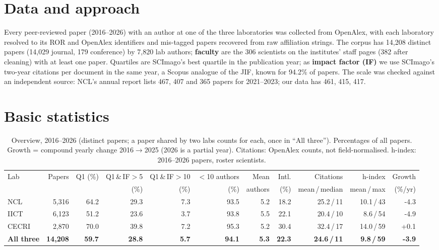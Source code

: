 \documentclass[10pt,a4paper,twocolumn]{article}
\begin{document}
\section{Data and approach}
Every peer-reviewed paper (2016--2026) with an author at one of the three laboratories was collected from OpenAlex, with each laboratory resolved to its ROR and OpenAlex identifiers and mis-tagged papers recovered from raw affiliation strings. The corpus has 14,208 distinct papers (14,029 journal, 179 conference) by 7,820 lab authors; \textbf{faculty} are the 306 scientists on the institutes' staff pages (382 after cleaning) with at least one paper. Quartiles are SCImago's best quartile in the publication year; as \textbf{impact factor (IF)} we use SCImago's two-year citations per document in the same year, a Scopus analogue of the JIF, known for 94.2\% of papers. The scale was checked against an independent source: NCL's annual report lists 467, 407 and 365 papers for 2021--2023; our data has 461, 415, 417.

\section{Basic statistics}
\begin{table}[t]
\centering\small
\caption{Overview, 2016--2026 (distinct papers; a paper shared by two labs counts for each, once in ``All three''). Percentages of all papers. Growth = compound yearly change 2016$\to$2025 (2026 is a partial year). Citations: OpenAlex counts, not field-normalised. h-index: 2016--2026 papers, roster scientists.}
\begin{tabular}{@{}lrrrrrrrrrr@{}}
\toprule
Lab & Papers & Q1 (\%) & Q1\,\&\,IF$>$5 & Q1\,\&\,IF$>$10 & $<$10 authors & Mean & Intl. & Citations & h-index & Growth \\
 & & & (\%) & (\%) & (\%) & authors & (\%) & mean\,/\,median & mean\,/\,max & (\%/yr) \\
\midrule
NCL & 5,316 & 64.2 & 29.3 & 7.3 & 93.5 & 5.2 & 18.2 & 25.2\,/\,11 & 10.1\,/\,43 & -4.3 \\
IICT & 6,123 & 51.2 & 23.6 & 3.7 & 93.8 & 5.5 & 22.1 & 20.4\,/\,10 & 8.6\,/\,54 & -4.9 \\
CECRI & 2,870 & 70.0 & 39.8 & 7.2 & 95.3 & 5.2 & 30.4 & 32.4\,/\,17 & 14.0\,/\,59 & +0.1 \\
\textbf{All three} & \textbf{14,208} & \textbf{59.7} & \textbf{28.8} & \textbf{5.7} & \textbf{94.1} & \textbf{5.3} & \textbf{22.3} & \textbf{24.6\,/\,11} & \textbf{9.8\,/\,59} & \textbf{-3.9} \\
\bottomrule
\end{tabular}
\end{table}
\end{document}
